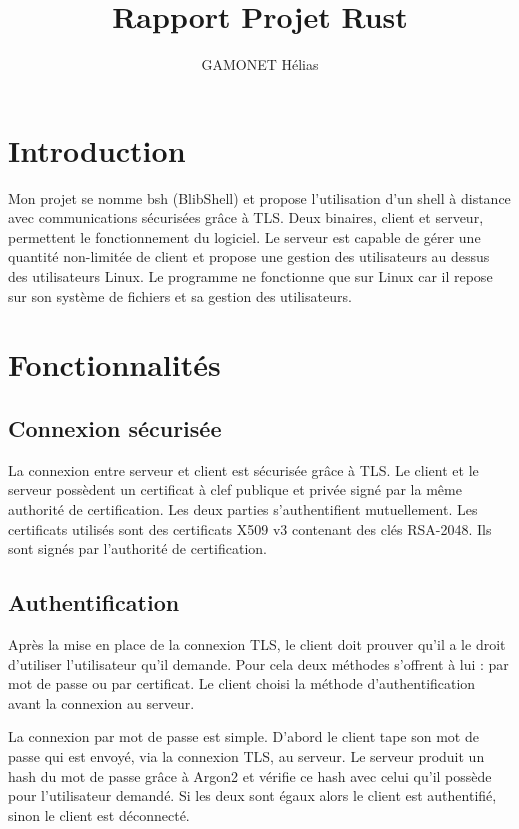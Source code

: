 \documentclass[french]{article}
\title{Rapport Projet Rust}
\author{GAMONET Hélias}
\begin{document}
\maketitle

\tableofcontents
\pagebreak

\section{Introduction}

Mon projet se nomme bsh (BlibShell) et propose l'utilisation d'un shell à distance avec communications sécurisées grâce à TLS. Deux binaires, client et serveur, permettent le fonctionnement du logiciel. Le serveur est capable de gérer une quantité non-limitée de client et propose une gestion des utilisateurs au dessus des utilisateurs Linux. Le programme ne fonctionne que sur Linux car il repose sur son système de fichiers et sa gestion des utilisateurs.

\section{Fonctionnalités}

\subsection{Connexion sécurisée}

La connexion entre serveur et client est sécurisée grâce à TLS. Le client et le serveur possèdent un certificat à clef publique et privée signé par la même authorité de certification. Les deux parties s'authentifient mutuellement. Les certificats utilisés sont des certificats X509 v3 contenant des clés RSA-2048. Ils sont signés par l'authorité de certification.

\subsection{Authentification}

Après la mise en place de la connexion TLS, le client doit prouver qu'il a le droit d'utiliser l'utilisateur qu'il demande. Pour cela deux méthodes s'offrent à lui : par mot de passe ou par certificat. Le client choisi la méthode d'authentification avant la connexion au serveur.

\medspace

La connexion par mot de passe est simple. D'abord le client tape son mot de passe qui est envoyé, via la connexion TLS, au serveur. Le serveur produit un hash du mot de passe grâce à Argon2 et vérifie ce hash avec celui qu'il possède pour l'utilisateur demandé. Si les deux sont égaux alors le client est authentifié, sinon le client est déconnecté.
\end{document}
